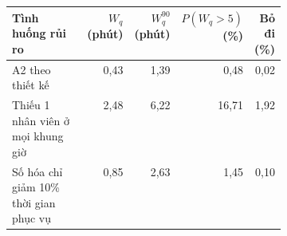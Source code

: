 \begin{tabular}{p{0.40\linewidth}rrrr}
\toprule
\textbf{Tình huống rủi ro} & \textbf{$W_q$ (phút)} & \textbf{$W_q^{90}$ (phút)} & \textbf{$P(W_q{>}5)$ (\%)} & \textbf{Bỏ đi (\%)} \\
\midrule
A2 theo thiết kế & 0{,}43 & 1{,}39 & 0{,}48 & 0{,}02 \\
Thiếu 1 nhân viên ở mọi khung giờ & 2{,}48 & 6{,}22 & 16{,}71 & 1{,}92 \\
Số hóa chỉ giảm 10\% thời gian phục vụ & 0{,}85 & 2{,}63 & 1{,}45 & 0{,}10 \\
\bottomrule
\end{tabular}
